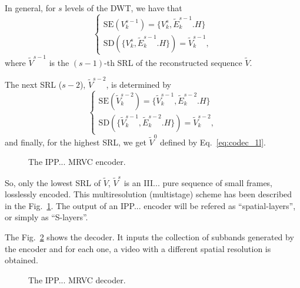 In general, for $s$ levels of the DWT, we have that
\begin{equation}
  \left\{
    \begin{array}{l}
      \text{SE}(V^{s-1}_k) = \{V^s_k, \tilde{E}^{s-1}_k.H\} \\
      \text{SD}(\{V^s_k, \tilde{E}^{s-1}_k.H\}) = \tilde{V}^{s-1}_k,
    \end{array}
  \right.
  \label{eq:codec_sl}
\end{equation}
where $\tilde{V}^{s-1}$ is the $(s-1)$-th SRL of the reconstructed
sequence $\tilde{V}$.

The next SRL ($s-2$), $\tilde{V}^{s-2}$, is determined by
\begin{equation}
  \left\{
    \begin{array}{l}
      \text{SE}(\tilde{V}^{s-2}_k) = \{\tilde{V}^{s-1}_k, \tilde{E}^{s-2}_k.H\} \\
      \text{SD}(\{\tilde{V}^{s-1}_k, \tilde{E}^{s-2}_k.H\}) = \tilde{V}^{s-2}_k,
    \end{array}
  \right.
  \label{eq:codec_s1l}
\end{equation}
and finally, for the highest SRL, we get $\tilde{V}^0$ defined by
Eq.~\ref{eq:codec_1l}.

\begin{figure}
  \centering
  \caption{The IPP... MRVC encoder.}
  \label{fig:encoder}
\end{figure}

So, only the lowest SRL of $\tilde{V}$, $\tilde{V}^s$ is an
III... pure sequence of small frames, losslessly encoded. This
multiresolution (multistage) scheme has been described in the
Fig.~\ref{fig:encoder}. The output of an IPP... encoder will be
refered as ``spatial-layers'', or simply as ``S-layers''.

The Fig.~\ref{fig:decoder} shows the decoder. It inputs the collection
of subbands generated by the encoder and for each one, a video with a
different spatial resolution is obtained.

\begin{figure}
  \centering
  \caption{The IPP... MRVC decoder.}
  \label{fig:decoder}
\end{figure}

